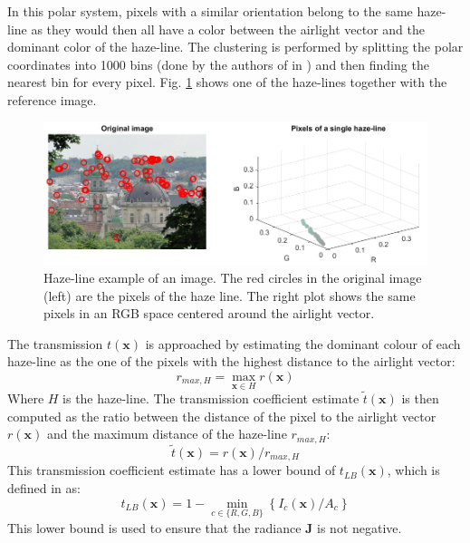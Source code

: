 \documentclass[conference]{IEEEtran}
\begin{document}
In this polar system, pixels with a similar orientation belong to the same haze-line as they would then all have a color between the airlight vector and the dominant color of the haze-line. The clustering is performed by splitting the polar coordinates into 1000 bins (done by the authors of \cite{dehaze} in \cite{github}) and then finding the nearest bin for every pixel. Fig. \ref{fig:haze_lines} shows one of the haze-lines together with the reference image. 
\begin{figure}
    \centering
    \includegraphics[width=\linewidth]{img/hazeLine.png}
    \caption{Haze-line example of an image. The red circles in the original image (left) are the pixels of the haze line. The right plot shows the same pixels in an RGB space centered around the airlight vector.}
    \label{fig:haze_lines}
\end{figure}
The transmission $t(\mathbf{x})$ is approached by estimating the dominant colour of each haze-line as the one of the pixels with the highest distance to the airlight vector:
\begin{equation}
    \label{eq:dominant_color}
    r_{max, H} = \max_{\mathbf{x} \in H} r(\mathbf{x})
\end{equation}
Where $H$ is the haze-line. The transmission coefficient estimate $\tilde{t}(\mathbf{x})$ is then computed as the ratio between the distance of the pixel to the airlight vector $r(\mathbf{x})$ and the maximum distance of the haze-line $r_{max, H}$:
\begin{equation}
    \label{eq:transmission_estimate}
    \tilde{t}(\mathbf{x}) = r(\mathbf{x})/r_{max, H}
\end{equation}
This transmission coefficient estimate has a lower bound of $t_{LB}(\mathbf{x})$, which is defined in \cite{dehaze} as:
\begin{equation}
    \label{eq:lower_bound_transmission}
    t_{LB}(\mathbf{x}) = 1 - \min_{c \in \{R, G, B\}} \left\{I_c(\mathbf{x}) / A_c\right\}
\end{equation}
This lower bound is used to ensure that the radiance $\mathbf{J}$ is not negative.\par
\end{document}
